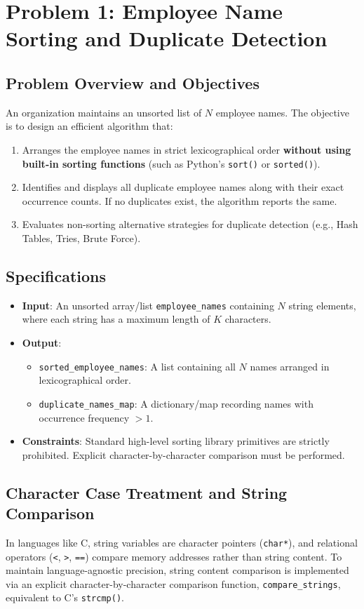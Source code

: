 \section{Problem 1: Employee Name Sorting and Duplicate Detection}

\subsection{Problem Overview and Objectives}
An organization maintains an unsorted list of $N$ employee names. The objective is to design an efficient algorithm that:
\begin{enumerate}
    \item Arranges the employee names in strict lexicographical order \textbf{without using built-in sorting functions} (such as Python's \texttt{sort()} or \texttt{sorted()}).
    \item Identifies and displays all duplicate employee names along with their exact occurrence counts. If no duplicates exist, the algorithm reports the same.
    \item Evaluates non-sorting alternative strategies for duplicate detection (e.g., Hash Tables, Tries, Brute Force).
\end{enumerate}

\subsection{Specifications}
\begin{itemize}
    \item \textbf{Input}: An unsorted array/list \texttt{employee\_names} containing $N$ string elements, where each string has a maximum length of $K$ characters.
    \item \textbf{Output}: 
    \begin{itemize}
        \item \texttt{sorted\_employee\_names}: A list containing all $N$ names arranged in lexicographical order.
        \item \texttt{duplicate\_names\_map}: A dictionary/map recording names with occurrence frequency $> 1$.
    \end{itemize}
    \item \textbf{Constraints}: Standard high-level sorting library primitives are strictly prohibited. Explicit character-by-character comparison must be performed.
\end{itemize}

\subsection{Character Case Treatment and String Comparison}
In languages like C, string variables are character pointers (\texttt{char*}), and relational operators (\texttt{<}, \texttt{>}, \texttt{==}) compare memory addresses rather than string content. To maintain language-agnostic precision, string content comparison is implemented via an explicit character-by-character comparison function, \texttt{compare\_strings}, equivalent to C's \texttt{strcmp()}.

